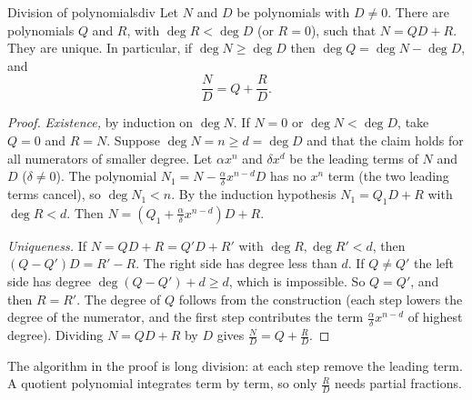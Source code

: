 \documentclass[11pt]{article}
\begin{document}
\begin{thm}{Division of polynomials}{div}
Let $N$ and $D$ be polynomials with $D\ne0$. There are polynomials $Q$ and $R$, with $\deg R<\deg D$ (or $R=0$), such that $N=QD+R$. They are unique. In particular, if $\deg N\ge\deg D$ then $\deg Q=\deg N-\deg D$, and
\[\frac ND=Q+\frac RD .\]
\end{thm}
\begin{proof}
\emph{Existence,} by induction on $\deg N$. If $N=0$ or $\deg N<\deg D$, take $Q=0$ and $R=N$. Suppose $\deg N=n\ge d=\deg D$ and that the claim holds for all numerators of smaller degree. Let $\alpha x^n$ and $\delta x^d$ be the leading terms of $N$ and $D$ ($\delta\ne0$). The polynomial $N_1=N-\frac\alpha\delta x^{n-d}D$ has no $x^n$ term (the two leading terms cancel), so $\deg N_1<n$. By the induction hypothesis $N_1=Q_1D+R$ with $\deg R<d$. Then $N=\left(Q_1+\frac\alpha\delta x^{n-d}\right)D+R$.

\emph{Uniqueness.} If $N=QD+R=Q'D+R'$ with $\deg R,\deg R'<d$, then $(Q-Q')D=R'-R$. The right side has degree less than $d$. If $Q\ne Q'$ the left side has degree $\deg(Q-Q')+d\ge d$, which is impossible. So $Q=Q'$, and then $R=R'$. The degree of $Q$ follows from the construction (each step lowers the degree of the numerator, and the first step contributes the term $\frac\alpha\delta x^{n-d}$ of highest degree). Dividing $N=QD+R$ by $D$ gives $\frac ND=Q+\frac RD$.
\end{proof}

The algorithm in the proof is long division: at each step remove the leading term. A quotient polynomial integrates term by term, so only $\frac RD$ needs partial fractions.
\end{document}
